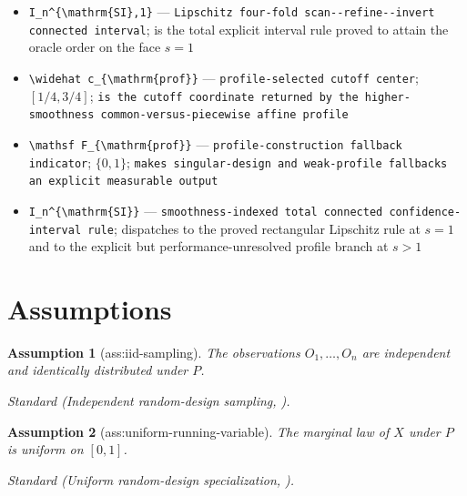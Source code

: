 \documentclass{article}
\newtheorem{assumption}{Assumption}
\begin{document}
\begin{itemize}
  \item \texttt{I\_\allowbreak{}n\textasciicircum{}\{\textbackslash{}\allowbreak{}mathrm\{SI\}\allowbreak{},\allowbreak{}1\}\allowbreak{}} --- \texttt{Lipschitz four-\allowbreak{}fold scan-\allowbreak{}-\allowbreak{}refine-\allowbreak{}-\allowbreak{}invert connected interval}; is the total explicit interval rule proved to attain the oracle order on the face \(s=1\)
  \item \texttt{\textbackslash{}\allowbreak{}widehat c\_\allowbreak{}\{\textbackslash{}\allowbreak{}mathrm\{prof\}\allowbreak{}\}\allowbreak{}} --- \texttt{profile-\allowbreak{}selected cutoff center}; \([1/4,3/4]\); \texttt{is the cutoff coordinate returned by the higher-\allowbreak{}smoothness common-\allowbreak{}versus-\allowbreak{}piecewise affine profile}
  \item \texttt{\textbackslash{}\allowbreak{}mathsf F\_\allowbreak{}\{\textbackslash{}\allowbreak{}mathrm\{prof\}\allowbreak{}\}\allowbreak{}} --- \texttt{profile-\allowbreak{}construction fallback indicator}; \(\{0,1\}\); \texttt{makes singular-\allowbreak{}design and weak-\allowbreak{}profile fallbacks an explicit measurable output}
  \item \texttt{I\_\allowbreak{}n\textasciicircum{}\{\textbackslash{}\allowbreak{}mathrm\{SI\}\allowbreak{}\}\allowbreak{}} --- \texttt{smoothness-\allowbreak{}indexed total connected confidence-\allowbreak{}interval rule}; dispatches to the proved rectangular Lipschitz rule at \(s=1\) and to the explicit but performance-unresolved profile branch at \(s>1\)
\end{itemize}

\section{Assumptions}

\begin{assumption}[ass:iid-sampling]\label{ass:iid-sampling}
The observations \(O_1,\ldots,O_n\) are independent and identically distributed under \(P\).
\par\smallskip\noindent\emph{Standard} (Independent random-design sampling, \cite{NoackRothe2024}).
\end{assumption}

\begin{assumption}[ass:uniform-running-variable]\label{ass:uniform-running-variable}
The marginal law of \(X\) under \(P\) is uniform on \([0,1]\).
\par\smallskip\noindent\emph{Standard} (Uniform random-design specialization, \cite{PorterYu2015}).
\end{assumption}
\end{document}

